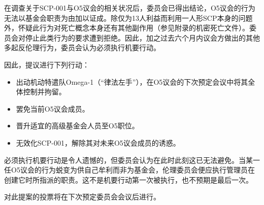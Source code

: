 \begin{scpbox}

\begin{center}



\end{center}

在调查关于SCP-001与O5议会的相关状况后，委员会已得出结论，O5议会的行为无法以基金会职责为由加以证成。除仅为13人利益而利用一人形SCP本身的问题外，怀疑此行为对死亡概念本身还有其他副作用（参见附录的机密死亡文件）。委员会对停止此类行为的要求遭到拒绝。因此，加之过去六个月内议会方做出的其他多起反伦理行为，委员会认为必须执行机要行动。

因此，提议进行下列行动：

\begin{itemize}
\item 出动机动特遣队Omega-1（“律法左手”），在O5议会的下次预定会议中将其全体控制并拘留。
\item 罢免当前O5议会成员。
\item 晋升适宜的高级基金会人员至O5职位。
\item 无效化SCP-001，解除其对未来O5议会成员的诱惑。
\end{itemize}

必须执行机要行动是令人遗憾的，但委员会认为在此时此刻这已无法避免。当某一任O5议会的行为蜕变为供自己牟利而非为基金会，伦理委员会便应执行管理员在创建它时所指派的职责。这不是机要行动第一次被执行，也不预期是最后一次。

对此提案的投票将在下次预定委员会会议后进行。

\begin{center}

\\
\\


\end{center}

\end{scpbox}


\begin{scpbox}


\end{scpbox}


